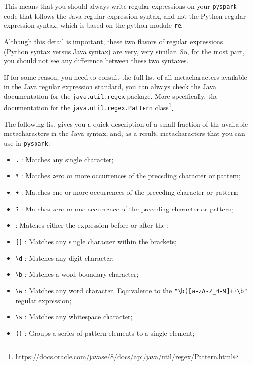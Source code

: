 \documentclass[
  11pt,
  letterpaper,
  DIV=11,
  numbers=noendperiod]{scrreprt}
\providecommand{\tightlist}{%
  \setlength{\itemsep}{0pt}\setlength{\parskip}{0pt}}\usepackage{longtable,booktabs,array}
\begin{document}
This means that you should always write regular expressions on your
\texttt{pyspark} code that follows the Java regular expression syntax,
and not the Python regular expression syntax, which is based on the
python module \texttt{re}.

Although this detail is important, these two flavors of regular
expressions (Python syntax versus Java syntax) are very, very similar.
So, for the most part, you should not see any difference between these
two syntaxes.

If for some reason, you need to consult the full list of all
metacharacters available in the Java regular expression standard, you
can always check the Java documentation for the \texttt{java.util.regex}
package. More specifically, the
\href{https://docs.oracle.com/javase/8/docs/api/java/util/regex/Pattern.html}{documentation
for the \texttt{java.util.regex.Pattern} class}\footnote{\url{https://docs.oracle.com/javase/8/docs/api/java/util/regex/Pattern.html}}.

The following list gives you a quick description of a small fraction of
the available metacharacters in the Java syntax, and, as a result,
metacharacters that you can use in \texttt{pyspark}:

\begin{itemize}
\tightlist
\item
  \texttt{.} : Matches any single character;
\item
  \texttt{*} : Matches zero or more occurrences of the preceding
  character or pattern;
\item
  \texttt{+} : Matches one or more occurrences of the preceding
  character or pattern;
\item
  \texttt{?} : Matches zero or one occurrence of the preceding character
  or pattern;
\item
  \texttt{\textbar{}} : Matches either the expression before or after
  the \texttt{\textbar{}};
\item
  \texttt{{[}{]}} : Matches any single character within the brackets;
\item
  \texttt{\textbackslash{}d} : Matches any digit character;
\item
  \texttt{\textbackslash{}b} : Matches a word boundary character;
\item
  \texttt{\textbackslash{}w} : Matches any word character. Equivalente
  to the
  \texttt{"\textbackslash{}b({[}a-zA-Z\_0-9{]}+)\textbackslash{}b"}
  regular expression;
\item
  \texttt{\textbackslash{}s} : Matches any whitespace character;
\item
  \texttt{()} : Groups a series of pattern elements to a single element;
\end{itemize}
\end{document}
